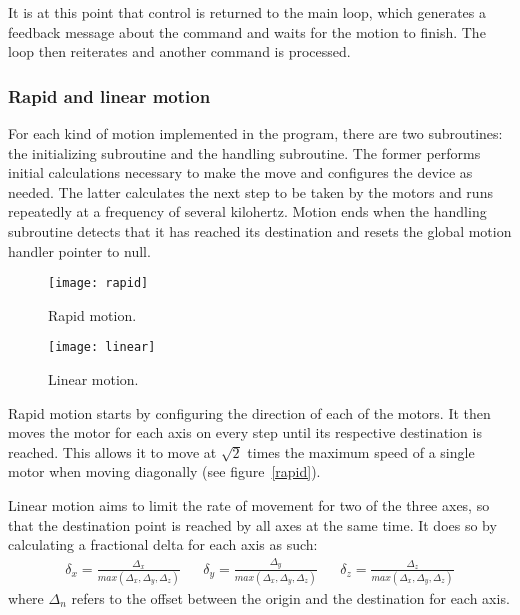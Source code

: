 It is at this point that control is returned to the main loop, which generates
a feedback message about the command and waits for the motion to finish. The
loop then reiterates and another command is processed.

\subsubsection{Rapid and linear motion}

For each kind of motion implemented in the program, there are two subroutines:
the initializing subroutine and the handling subroutine. The former performs
initial calculations necessary to make the move and configures the device as
needed. The latter calculates the next step to be taken by the motors and runs
repeatedly at a frequency of several kilohertz. Motion ends when the handling
subroutine detects that it has reached its destination and resets the global
motion handler pointer to null.

\begin{figure}[ht]
    \centering
    \begin{minipage}{0.5\textwidth}
        \centering
        \texttt{[image: rapid]}
        \caption{Rapid motion.}
        \label{rapid}
    \end{minipage}\hfill
    \begin{minipage}{0.5\textwidth}
        \centering
        \texttt{[image: linear]}
        \caption{Linear motion.}
        \label{linear}
    \end{minipage}
\end{figure}

Rapid motion starts by configuring the direction of each of the motors. It then
moves the motor for each axis on every step until its respective destination
is reached. This allows it to move at $\sqrt{2}$ times the maximum speed of
a single motor when moving diagonally (see figure~\ref{rapid}).

Linear motion aims to limit the rate of movement for two of the three axes, so
that the destination point is reached by all axes at the same time. It does so
by calculating a fractional delta for each axis as such:
\begin{align*}
    \delta_{x} = \frac{\Delta_{x}}{max(\Delta_{x}, \Delta_{y}, \Delta_{z})} &&
    \delta_{y} = \frac{\Delta_{y}}{max(\Delta_{x}, \Delta_{y}, \Delta_{z})} &&
    \delta_{z} = \frac{\Delta_{z}}{max(\Delta_{x}, \Delta_{y}, \Delta_{z})}
\end{align*}
where $\Delta_n$ refers to the offset between the origin and the destination for
each axis.

